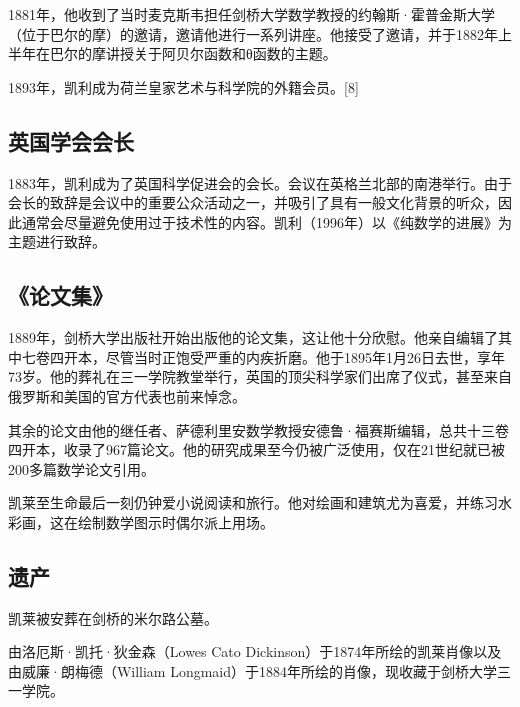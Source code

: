 1881年，他收到了当时麦克斯韦担任剑桥大学数学教授的约翰斯·霍普金斯大学（位于巴尔的摩）的邀请，邀请他进行一系列讲座。他接受了邀请，并于1882年上半年在巴尔的摩讲授关于阿贝尔函数和θ函数的主题。

1893年，凯利成为荷兰皇家艺术与科学院的外籍会员。[8]
\subsection{英国学会会长}  
1883年，凯利成为了英国科学促进会的会长。会议在英格兰北部的南港举行。由于会长的致辞是会议中的重要公众活动之一，并吸引了具有一般文化背景的听众，因此通常会尽量避免使用过于技术性的内容。凯利（1996年）以《纯数学的进展》为主题进行致辞。
\subsection{《论文集》}  
1889年，剑桥大学出版社开始出版他的论文集，这让他十分欣慰。他亲自编辑了其中七卷四开本，尽管当时正饱受严重的内疾折磨。他于1895年1月26日去世，享年73岁。他的葬礼在三一学院教堂举行，英国的顶尖科学家们出席了仪式，甚至来自俄罗斯和美国的官方代表也前来悼念。  

其余的论文由他的继任者、萨德利里安数学教授安德鲁·福赛斯编辑，总共十三卷四开本，收录了967篇论文。他的研究成果至今仍被广泛使用，仅在21世纪就已被200多篇数学论文引用。  

凯莱至生命最后一刻仍钟爱小说阅读和旅行。他对绘画和建筑尤为喜爱，并练习水彩画，这在绘制数学图示时偶尔派上用场。
\subsection{遗产}
凯莱被安葬在剑桥的米尔路公墓。  

由洛厄斯·凯托·狄金森（Lowes Cato Dickinson）于1874年所绘的凯莱肖像以及由威廉·朗梅德（William Longmaid）于1884年所绘的肖像，现收藏于剑桥大学三一学院。

